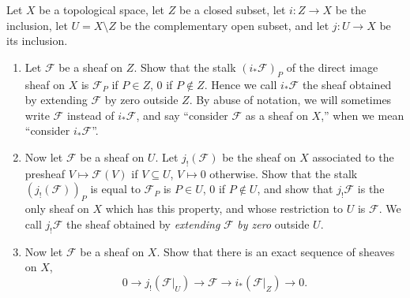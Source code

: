 \begin{exercise}%
	Let $X $ be a topological space, let $Z $ be a closed subset, let $i: Z\to X $ be the inclusion, let $U = X \setminus Z $ be the complementary open subset, and let $j: U\to X $ be its inclusion.
	\begin{enumerate}
		\item Let $\mathcal{F} $ be a sheaf on $Z $. Show that the stalk $(i_\ast \mathcal{F})_P $ of the direct image sheaf on $X $ is $\mathcal{F}_P $ if $P\in Z $, $0 $ if $P\notin Z $. Hence we call $i_\ast \mathcal{F} $ the sheaf obtained by extending $\mathcal{F} $ by zero outside $Z $. By abuse of notation, we will sometimes write $\mathcal{F} $ instead of $i_\ast \mathcal{F} $, and say ``consider $\mathcal{F} $ as a sheaf on $X $,'' when we mean ``consider $i_\ast \mathcal{F}$''.
		\item Now let $\mathcal{F} $ be a sheaf on $U $. Let $j_!(\mathcal{F}) $ be the sheaf on $X $ associated to the presheaf $V\mapsto \mathcal{F}(V) $ if $V\subseteq U $, $V\mapsto 0 $ otherwise. Show that the stalk $(j_!(\mathcal{F}))_P $ is equal to $\mathcal{F}_P $ is $P\in U $, $0 $ if $P\notin U $, and show that $j_! \mathcal{F} $ is the only sheaf on $X $ which has this property, and whose restriction to $U $ is $\mathcal{F} $. We call $j_! \mathcal{F} $ the sheaf obtained by \textit{extending} $\mathcal{F} $ \textit{by zero} outside $U $.
		\item Now let $\mathcal{F} $ be a sheaf on $X $. Show that there is an exact sequence of sheaves on $X $,
			\[
				0 \to j_!(\mathcal{F}|_U) \to \mathcal{F} \to i_\ast(\mathcal{F}|_Z) \to 0
			.\]
	\end{enumerate}
\end{exercise}
